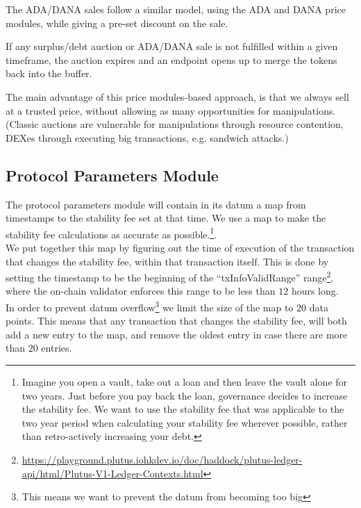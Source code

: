 \documentclass{article} %
\begin{document}
The ADA/DANA sales follow a similar model, using the ADA and DANA price modules,
while giving a pre-set discount on the sale.

If any surplus/debt auction or ADA/DANA sale is not fulfilled within a given
timeframe, the auction expires and an endpoint opens up to merge the tokens back
into the buffer.

The main advantage of this price modules-based approach, is that we always sell
at a trusted price, without allowing as many opportunities for manipulations.
(Classic auctions are vulnerable for manipulations through resource contention,
DEXes through executing big transactions, e.g. sandwich attacks.)

\subsection{Protocol Parameters Module}

The protocol parameters module will contain in its datum a map from timestamps to the stability fee
set at that time.
We use a map to make the stability fee calculations as accurate as
possible.\footnote{
  Imagine you open a vault, take out a loan and then leave the vault alone for
  two years.
  Just before you pay back the loan, governance decides to increase the
  stability fee.
  We want to use the stability fee that was applicable to the two year period
  when calculating your stability fee wherever possible, rather than
  retro-actively increasing your debt.
}. \\

We put together this map by figuring out the time of execution of the
transaction that changes the stability fee, within that transaction itself.
This is done by setting the timestamp to be the beginning of the
``txInfoValidRange'' range\footnote{
  \url{https://playground.plutus.iohkdev.io/doc/haddock/plutus-ledger-api/html/Plutus-V1-Ledger-Contexts.html}},
where the on-chain validator enforces this range to be less than $12$ hours
long. \\

In order to prevent datum overflow\footnote{
  This means we want to prevent the datum from becoming too big}
we limit the size of the map to $20$ data points.
This means that any transaction that changes the stability fee, will both add a
new entry to the map, and remove the oldest entry in case there are more than
$20$ entries. \\
\end{document}
